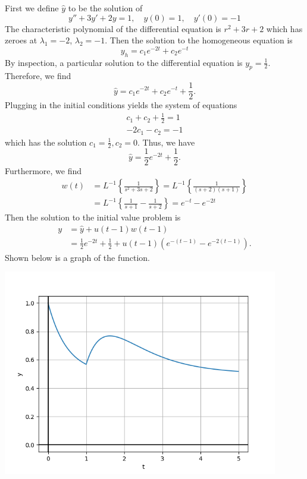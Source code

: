 \documentclass[11pt, titlepage]{article}
\begin{document}
    \begin{solution}
        First we define $\hat{y}$ to be the solution of
        \[
            y'' + 3y' + 2y = 1, \quad y(0) = 1, \quad y'(0) = -1
        \] 
        The characteristic polynomial of the differential equation is $r^2 + 3r
        + 2$ which has zeroes at $\lambda_1 = -2$, $\lambda_2 = -1$. Then the
        solution to the homogeneous equation is
        \[
        y_h = c_1 e^{-2t} + c_2 e^{-t}
        \] 
        By inspection, a particular solution to the differential equation is
        $y_p = \frac{1}{2}$. Therefore, we find
        \[
            \hat{y} = c_1 e^{-2t} + c_2 e^{-t} + \frac{1}{2}.
        \] 
        Plugging in the initial conditions yields the system of equations
        \begin{gather*}
            c_1 + c_2 + \frac{1}{2} = 1 \\
            -2c_1 - c_2 = -1
        \end{gather*}
        which has the solution $c_1 = \frac{1}{2}, c_2 = 0$. Thus, we have
        \[
            \hat{y} = \frac{1}{2} e^{-2t} + \frac{1}{2}.
        \] 
        Furthermore, we find
        \begin{align*}
            w(t) &= L^{-1} \left\{ \frac{1}{s^2 + 3s + 2} \right\} = L^{-1}
            \left\{ \frac{1}{(s + 2) (s + 1)} \right\} \\
                 &= L^{-1} \left\{ \frac{1}{s+1} - \frac{1}{s+2} \right\} =
                 e^{-t} - e^{-2t}
        \end{align*}
        Then the solution to the initial value problem is
        \begin{align*}
            y &= \hat{y} + u(t - 1) w(t - 1) \\
              &= \frac{1}{2} e^{-2t} + \frac{1}{2}
              + u(t - 1) \left( e^{-(t - 1)} - e^{-2(t - 1)} \right).
        \end{align*}
        Shown below is a graph of the function.
        \begin{center}
            \includegraphics[width=0.9\textwidth]{media/graph.png}
        \end{center}
    \end{solution}
\end{document}
